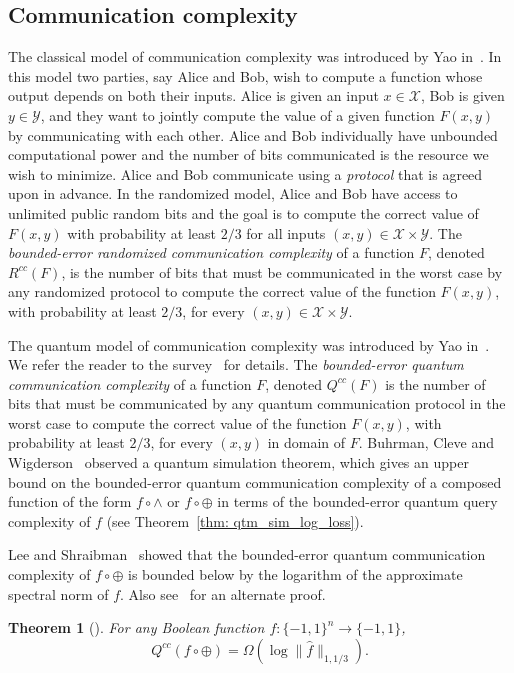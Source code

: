 \documentclass[10pt,a4paper]{article}
\newtheorem{theorem}{Theorem}
\theoremstyle{definition}
\newcommand{\bra}[1]{\{#1\}}
\newcommand{\pmone}{\bra{-1,1}}
\newcommand{\asnorm}[2]{\|\widehat{#1}\|_{1,#2}}
\begin{document}
\subsection{Communication complexity}
The classical model of communication complexity was introduced by Yao in~\cite{Yao79}. In this model two parties, say Alice and Bob, wish to compute a function whose output depends on both their inputs. Alice is given an input $x \in \mathcal{X}$, Bob is given $y \in \mathcal{Y}$, and they want to jointly compute the value of a given function $F(x,y)$ by communicating with each other.  Alice and Bob individually have unbounded computational power and the number of bits communicated is the resource we wish to minimize. Alice and Bob communicate using a \emph{protocol} that is agreed upon in advance. In the randomized model, Alice and Bob have access to unlimited public random bits and the goal is to compute the correct value of $F(x,y)$ with probability at least $2/3$ for all inputs $(x,y) \in \mathcal{X} \times \mathcal{Y}$. The \emph{bounded-error randomized communication complexity} of a function $F$, denoted $R^{cc}(F)$, is the number of bits that must be communicated in the worst case by any randomized protocol to compute the correct value of the function $F(x,y)$, with probability at least $2/3$, for every $(x,y) \in \mathcal{X} \times \mathcal{Y}$.

The quantum model of communication complexity was introduced by Yao in~\cite{Yao93}. 
We refer the reader to the survey~\cite{Wolf02} for details. The \emph{bounded-error quantum communication complexity} of a function $F$, denoted $Q^{cc}(F)$ is the number of bits that must be communicated by any quantum communication protocol in the worst case to compute the correct value of the function $F(x,y)$, with probability at least $2/3$, for every $(x,y)$ in domain of $F$. Buhrman, Cleve and Wigderson~\cite{BCW98} observed a quantum simulation theorem, which gives an upper bound on the bounded-error quantum communication complexity of a composed function of the form $f \circ \wedge$ or $f \circ \oplus$ in terms of the bounded-error quantum query complexity of $f$ (see Theorem~\ref{thm: qtm_sim_log_loss}).

Lee and Shraibman~\cite{LS09} showed that the bounded-error quantum communication complexity of $f \circ \oplus$ is bounded below by the logarithm of the approximate spectral norm of $f$. Also see~\cite{CM17} for an alternate proof.
\begin{theorem}[\cite{LS09}]\label{thm: LS}
For any Boolean function $f : \pmone^n \to \pmone$,
\[
Q^{cc}(f \circ \oplus) = \Omega(\log \asnorm{f}{1/3}).
\]
\end{theorem}
\end{document}
